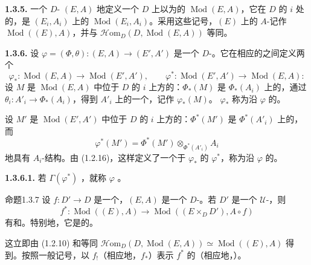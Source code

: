 \textbf{1.3.5.} 一个 $D$- $(E,A)$ 地定义一个 $D$ 上以为的 $\operatorname{Mod}(E,A)$，它在 $D$ 的 $i$ 处的，是 $(E_i,A_i)$ 上的 $\operatorname{Mod}(E_i,A_i)$。采用这些记号，$(E)$ 上的 $A$-记作 $\operatorname{Mod}((E),A)$，并与 $\mathscr{H}\mathrm{om}_D(D,\operatorname{Mod}(E,A))$ 等同。

\textbf{1.3.6.} 设 $\varphi=(\Phi,\theta):(E,A)\to(E',A')$ 是一个 $D$-。它在相应的之间定义两个
\[
\varphi_*:\operatorname{Mod}(E,A)\longrightarrow\operatorname{Mod}(E',A'),\qquad
\varphi^*:\operatorname{Mod}(E',A')\longrightarrow\operatorname{Mod}(E,A):
\]
设 $M$ 是 $\operatorname{Mod}(E,A)$ 中位于 $D$ 的 $i$ 上方的：$\Phi_*(M)$ 是 $\Phi_*(A_i)$ 上的，通过 $\theta_i:A'_i\to\Phi_*(A_i)$，得到 $A'_i$ 上的一个，记作 $\varphi_*(M)$。 $\varphi_*$ 称为沿 $\varphi$ 的。

设 $M'$ 是 $\operatorname{Mod}(E',A')$ 中位于 $D$ 的 $i$ 上方的：$\Phi^*(M')$ 是 $\Phi^*(A'_i)$ 上的，而
\[
\varphi^*(M')=\Phi^*(M')\otimes_{\Phi^*(A'_i)}A_i
\]
地具有 $A_i$-结构。由 (1.2.16)，这样定义了一个于 $\varphi_*$ 的 $\varphi^*$，称为沿 $\varphi$ 的。

\textbf{1.3.6.1.} 若 $\Gamma(\varphi^*)$ ，就称 $\varphi$ 。

\begin{SGAresult}{命题}{1.3.7}
设 $f:D'\to D$ 是一个，$(E,A)$ 是一个 $D$-。若 $D'$ 是一个 $\mathcal U$-，则
\[
f^*:\operatorname{Mod}((E),A)\longrightarrow\operatorname{Mod}((E\times_D D'),A\circ f)
\]
有和。特别地，它是的。
\end{SGAresult}
这立即由 (1.2.10) 和等同 $\mathscr{H}\mathrm{om}_D(D,\operatorname{Mod}(E,A))\simeq\operatorname{Mod}((E),A)$ 得到。按照一般记号，以 $f_!$（相应地，$f_*$）表示 $f^*$ 的（相应地，）。

